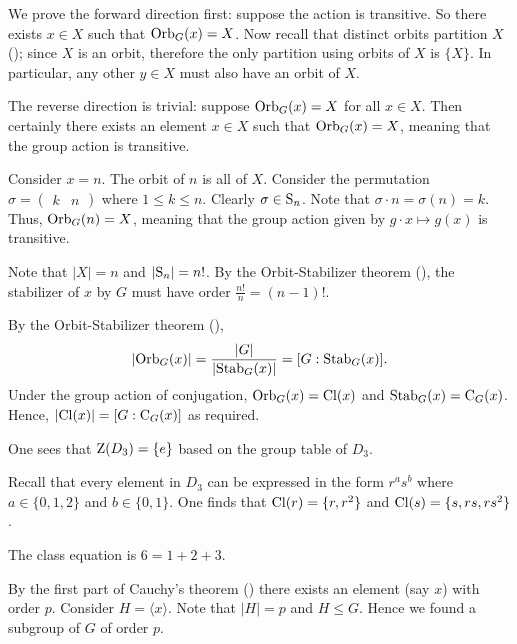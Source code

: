 \begin{questions}
    \item We prove the forward direction first: suppose the action is transitive. So there exists $x \in X$ such that $\mathrm{Orb}_{G}(x) = X$. Now recall that distinct orbits partition $X$ (); since $X$ is an orbit, therefore the only partition using orbits of $X$ is $\{X\}$. In particular, any other $y \in X$ must also have an orbit of $X$.

    The reverse direction is trivial: suppose $\mathrm{Orb}_{G}(x) = X$ for all $x \in X$. Then certainly there exists an element $x \in X$ such that $\mathrm{Orb}_{G}(x) = X$, meaning that the group action is transitive.

    \item \begin{partquestions}{\alph*}
        \item Consider $x = n$. The orbit of $n$ is all of $X$. Consider the permutation $\sigma = \begin{pmatrix}k & n\end{pmatrix}$ where $1 \leq k \leq n$. Clearly $\sigma \in \mathrm{S}_{n}$. Note that $\sigma \cdot n = \sigma(n) = k$. Thus, $\mathrm{Orb}_{G}(n) = X$, meaning that the group action given by $g \cdot x \mapsto g(x)$ is transitive.

        \item Note that $|X| = n$ and $|\mathrm{S}_{n}| = n!$. By the Orbit-Stabilizer theorem (), the stabilizer of $x$ by $G$ must have order $\frac{n!}{n} = (n-1)!$.
    \end{partquestions}

    \item By the Orbit-Stabilizer theorem (),
    \[
        |\mathrm{Orb}_{G}(x)| = \frac{|G|}{|\mathrm{Stab}_{G}(x)|} = [G : \mathrm{Stab}_{G}(x)].
    \]
    Under the group action of conjugation, $\mathrm{Orb}_{G}(x) = \mathrm{Cl}(x)$ and $\mathrm{Stab}_{G}(x) = \mathrm{C}_{G}(x)$. Hence, $|\mathrm{Cl}(x)| = [G : \mathrm{C}_{G}(x)]$ as required.

    \item \begin{partquestions}{\alph*}
        \item One sees that $\mathrm{Z}(D_3) = \{e\}$ based on the group table of $D_3$.
        \item Recall that every element in $D_3$ can be expressed in the form $r^as^b$ where $a \in \{0, 1, 2\}$ and $b \in \{0, 1\}$. One finds that $\mathrm{Cl}(r) = \{r, r^2\}$ and $\mathrm{Cl}(s) = \{s, rs, rs^2\}$.
        \item The class equation is $6 = 1 + 2 + 3$.
    \end{partquestions}

    \item By the first part of Cauchy's theorem () there exists an element (say $x$) with order $p$. Consider $H = \langle x \rangle$. Note that $|H| = p$ and $H \leq G$. Hence we found a subgroup of $G$ of order $p$.
\end{questions}

